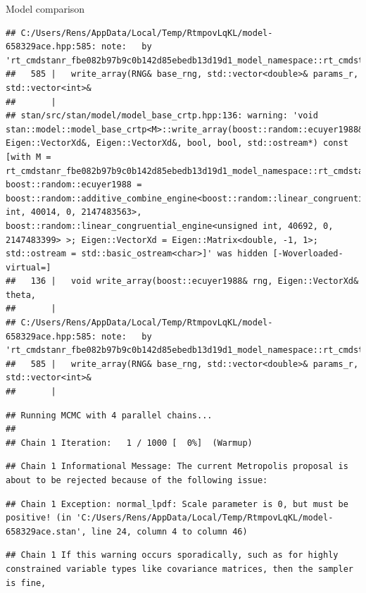 \documentclass[
  ignorenonframetext,
]{beamer}
\begin{document}
\begin{frame}[fragile]{Model comparison}
\begin{verbatim}
## C:/Users/Rens/AppData/Local/Temp/RtmpovLqKL/model-658329ace.hpp:585: note:   by 'rt_cmdstanr_fbe082b97b9c0b142d85ebedb13d19d1_model_namespace::rt_cmdstanr_fbe082b97b9c0b142d85ebedb13d19d1_model::write_array'
##   585 |   write_array(RNG& base_rng, std::vector<double>& params_r, std::vector<int>&
##       | 
## stan/src/stan/model/model_base_crtp.hpp:136: warning: 'void stan::model::model_base_crtp<M>::write_array(boost::random::ecuyer1988&, Eigen::VectorXd&, Eigen::VectorXd&, bool, bool, std::ostream*) const [with M = rt_cmdstanr_fbe082b97b9c0b142d85ebedb13d19d1_model_namespace::rt_cmdstanr_fbe082b97b9c0b142d85ebedb13d19d1_model; boost::random::ecuyer1988 = boost::random::additive_combine_engine<boost::random::linear_congruential_engine<unsigned int, 40014, 0, 2147483563>, boost::random::linear_congruential_engine<unsigned int, 40692, 0, 2147483399> >; Eigen::VectorXd = Eigen::Matrix<double, -1, 1>; std::ostream = std::basic_ostream<char>]' was hidden [-Woverloaded-virtual=]
##   136 |   void write_array(boost::ecuyer1988& rng, Eigen::VectorXd& theta,
##       | 
## C:/Users/Rens/AppData/Local/Temp/RtmpovLqKL/model-658329ace.hpp:585: note:   by 'rt_cmdstanr_fbe082b97b9c0b142d85ebedb13d19d1_model_namespace::rt_cmdstanr_fbe082b97b9c0b142d85ebedb13d19d1_model::write_array'
##   585 |   write_array(RNG& base_rng, std::vector<double>& params_r, std::vector<int>&
##       |
\end{verbatim}

\begin{verbatim}
## Running MCMC with 4 parallel chains...
## 
## Chain 1 Iteration:   1 / 1000 [  0%]  (Warmup)
\end{verbatim}

\begin{verbatim}
## Chain 1 Informational Message: The current Metropolis proposal is about to be rejected because of the following issue:
\end{verbatim}

\begin{verbatim}
## Chain 1 Exception: normal_lpdf: Scale parameter is 0, but must be positive! (in 'C:/Users/Rens/AppData/Local/Temp/RtmpovLqKL/model-658329ace.stan', line 24, column 4 to column 46)
\end{verbatim}

\begin{verbatim}
## Chain 1 If this warning occurs sporadically, such as for highly constrained variable types like covariance matrices, then the sampler is fine,
\end{verbatim}


\end{frame}
\end{document}

